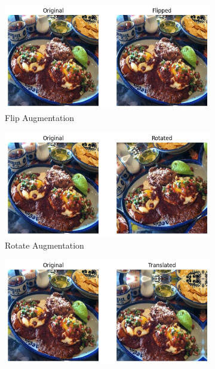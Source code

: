 \begin{figure}[htbp]
  \centering

  \begin{subfigure}[b]{0.45\textwidth}
    \includegraphics[width=\textwidth]{graphics/images/augmentation/flipped.png}
    \caption{Flip Augmentation}
    \label{fig:flipped}
  \end{subfigure}
  \hfill
  \begin{subfigure}[b]{0.45\textwidth}
    \includegraphics[width=\textwidth]{graphics/images/augmentation/rotated.png}
    \caption{Rotate Augmentation}
    \label{fig:rotated}
  \end{subfigure}
  \hfill
  \medskip
  \begin{subfigure}[b]{0.45\textwidth}
    \includegraphics[width=\textwidth]{graphics/images/augmentation/translated.png}

\end{subfigure}
\end{figure}
